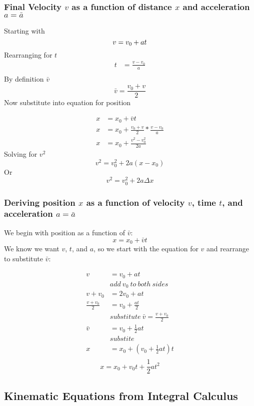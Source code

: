 \documentclass{article}
\numberwithin{equation}{section}
\begin{document}
 \subsubsection{Final Velocity $v$ as a function of distance $x$ and
 acceleration $a = \bar{a}$}
 Starting with
 \[
     v = v_{0}+at \\
\]
Rearranging for $t$
\[
  \begin{aligned}
    t &= \frac{v-v_{0}}{a}\\ 
  \end{aligned}
\]
By definition $\bar{v}$ 
\[
    \bar{v} = \frac{v_{0}+v}{2} 
\]
Now substitute into equation for position
 
\[
  \begin{aligned}
    x &= x_{0} + \bar{v}t \\
    x &= x_{0} + \frac{v_{0}+v}{2}*\frac{v - v_{0}}{a} \\
    x &= x_{0} + \frac{v^2-v_{0}^2}{2a}
  \end{aligned}
\]
Solving for $v^2$
 \[
    v^2 = v_{0}^2 + 2a(x-x_{0})
\]
Or
 \[
   \boxed{    v^2 = v_{0}^2 + 2a \Delta x}
\]
 \subsubsection{Deriving position $x$ as a function of velocity $v$, time $t$,
 and acceleration $a = \bar{a}$}
 We begin with position as a function of $\bar{v}$:
 \[
   x = x_{0} + \bar{v}t
\]
We know we want $v$, $t$, and $a$, so we start with the equation for $v$ and
rearrange to substitute $\bar{v}$:
 
\[
  \begin{aligned}
    v &= v_{0} + at \\
      & add\ v_{0}\ to\ both\ sides \\
    v+v_{0} &= 2v_{0} + at \\
    \frac{v+v_{0}}{2} &= v_{0} + \frac{at}{2} \\
                      & substitute\ \bar{v} = \frac{v+v_{0}}{2}\\ 
    \bar{v} &= v_{0} + \frac{1}{2}at \\
            & substite\\
            x &= x_{0} + (v_{0}+\frac{1}{2}at)t\\ 
  \end{aligned}
\]
 \[
   \boxed{                x = x_{0} + v_{0}t + \frac{1}{2}at^2}
\]
 \subsection{Kinematic Equations from Integral Calculus}
\end{document}
